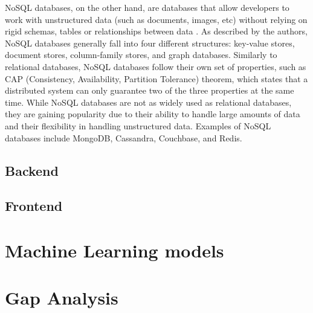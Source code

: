 NoSQL databases, on the other hand, are databases that allow developers to work with unstructured data (such as documents, images, etc) without relying on rigid schemas, tables or relationships between data \parencite{databases}. As described by the authors, NoSQL databases generally fall into four different structures: key-value stores, document stores, column-family stores, and graph databases. Similarly to relational databases, NoSQL databases follow their own set of properties, such as CAP (Consistency, Availability, Partition Tolerance) theorem, which states that a distributed system can only guarantee two of the three properties at the same time. While NoSQL databases are not as widely used as relational databases, they are gaining popularity due to their ability to handle large amounts of data and their flexibility in handling unstructured data. Examples of NoSQL databases include MongoDB, Cassandra, Couchbase, and Redis.

\subsection{Backend}

\subsection{Frontend}

\section{Machine Learning models}

\section{Gap Analysis}